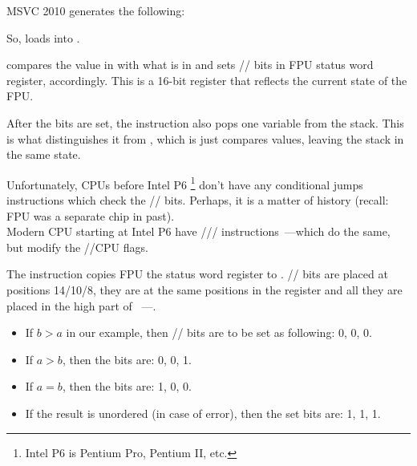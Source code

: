 ﻿

MSVC 2010 generates the following:




So, \FLD loads  into .

\label{Czero_etc}
\newcommand{\Czero}{\GTT{C0}\xspace}
\newcommand{\Ctwo}{\GTT{C2}\xspace}
\newcommand{\Cthree}{\GTT{C3}\xspace}
\newcommand{\CThreeBits}{\Cthree/\Ctwo/\Czero}


\FCOMP compares the value in  with what is in  
and sets \CThreeBits bits in FPU status word register, accordingly. 
This is a 16-bit register that reflects the current state of the FPU.

After the bits are set, the \FCOMP instruction also pops one variable from the stack. 
This is what distinguishes it from \FCOM, which is just compares values, leaving the stack in the same state.

Unfortunately, CPUs before Intel P6
\footnote{Intel P6 is Pentium Pro, Pentium II, etc.} don't have any conditional 
jumps instructions which check the \CThreeBits bits. 
Perhaps, it is a matter of history (recall: FPU was a separate chip in past).\\
Modern CPU starting at Intel P6 have \FCOMI/\FCOMIP/\FUCOMI/\FUCOMIP 
instructions~---which do the same, but modify the \ZF/\PF/\CF CPU flags.


The \FNSTSW instruction copies FPU the status word register to \AX. 
\CThreeBits bits are placed at positions 14/10/8, 
they are at the same positions in the \AX register and all they are placed in the high part of \AX{}~---\AH{}.

\begin{itemize}
\item If $b>a$ in our example, then \CThreeBits bits are to be set as following: 0, 0, 0.
\item If $a>b$, then the bits are: 0, 0, 1.
\item If $a=b$, then the bits are: 1, 0, 0.
\item

If the result is unordered (in case of error), then the set bits are: 1, 1, 1.
\end{itemize}

